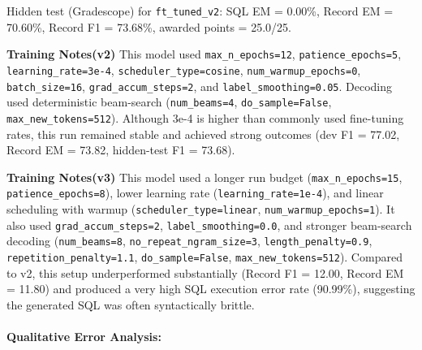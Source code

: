 \documentclass{article}
\begin{document}
Hidden test (Gradescope) for \texttt{ft\_tuned\_v2}: SQL EM = 0.00\%,
Record EM = 70.60\%, Record F1 = 73.68\%, awarded points = 25.0/25.

\textbf{Training Notes(v2)}
This model used \texttt{max\_n\_epochs=12},
\texttt{patience\_epochs=5}, \texttt{learning\_rate=3e-4},
\texttt{scheduler\_type=cosine}, \texttt{num\_warmup\_epochs=0},
\texttt{batch\_size=16}, \texttt{grad\_accum\_steps=2}, and
\texttt{label\_smoothing=0.05}. Decoding used deterministic
beam-search (\texttt{num\_beams=4}, \texttt{do\_sample=False},
\texttt{max\_new\_tokens=512}). Although 3e-4 is higher than
commonly used fine-tuning rates, this run remained stable and achieved
strong outcomes (dev F1 = 77.02, Record EM = 73.82, hidden-test F1 =
73.68).

\textbf{Training Notes(v3)}
This model used a longer run budget (\texttt{max\_n\_epochs=15},
\texttt{patience\_epochs=8}), lower learning rate
(\texttt{learning\_rate=1e-4}), and linear scheduling with warmup
(\texttt{scheduler\_type=linear}, \texttt{num\_warmup\_epochs=1}).
It also used \texttt{grad\_accum\_steps=2},
\texttt{label\_smoothing=0.0}, and stronger beam-search decoding
(\texttt{num\_beams=8}, \texttt{no\_repeat\_ngram\_size=3},
\texttt{length\_penalty=0.9},
\texttt{repetition\_penalty=1.1}, \texttt{do\_sample=False},
\texttt{max\_new\_tokens=512}). Compared to v2, this setup
underperformed substantially (Record F1 = 12.00, Record EM = 11.80)
and produced a very high SQL execution error rate (90.99\%),
suggesting the generated SQL was often syntactically brittle.

\paragraph{Qualitative Error Analysis:}
\end{document}
